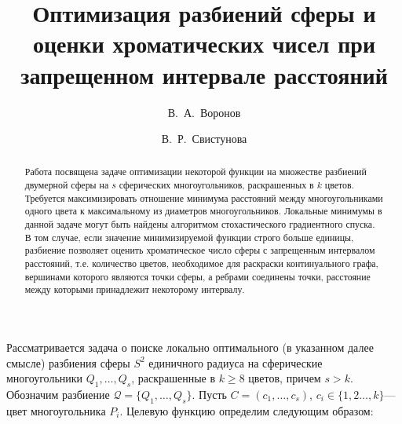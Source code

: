 \usepackage[russian]{nla}





\fi

\title{Оптимизация разбиений сферы и оценки  хроматических чисел при запрещенном интервале расстояний}
\author{В.~А.~Воронов   %
  \and  %
  В.~Р.~Свистунова  %
}

\maketitle

\begin{abstract}
Работа посвящена  задаче оптимизации некоторой функции на множестве разбиений  двумерной сферы на $s$ сферических многоугольников, раскрашенных в $k$ цветов. Требуется максимизировать отношение минимума расстояний между многоугольниками одного цвета к максимальному из диаметров многоугольников. Локальные минимумы в данной задаче могут быть найдены алгоритмом стохастического градиентного спуска. В том случае, если значение минимизируемой функции строго больше единицы, разбиение позволяет оценить хроматическое число сферы с запрещенным интервалом расстояний, т.е. количество цветов, необходимое для раскраски континуального графа, вершинами которого являются точки сферы, а ребрами соединены точки, расстояние между которыми принадлежит некоторому интервалу.

\end{abstract}


Рассматривается задача о поиске локально оптимального  (в указанном далее смысле) разбиения  сферы $S^{2}$ единичного радиуса на сферические многоугольники $Q_1, \dots, Q_s$, раскрашенные в $k \geq 8$ цветов, причем $s>k$. Обозначим разбиение $\mathcal{Q}=\{Q_1, \dots, Q_s \}$. Пусть $C=(c_1, \dots, c_s)$, $c_i \in \{1,2 \dots, k \}$---  цвет многоугольника $P_i$. Целевую функцию определим следующим образом:

